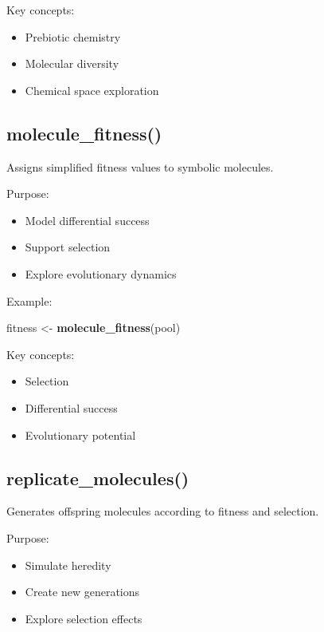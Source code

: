 \documentclass[
  oneside,
  openany]{book}
\newenvironment{Shaded}{\begin{snugshade}}{\end{snugshade}}
\newcommand{\FunctionTok}[1]{\textcolor[rgb]{0.13,0.29,0.53}{\textbf{#1}}}
\newcommand{\NormalTok}[1]{#1}
\newcommand{\OtherTok}[1]{\textcolor[rgb]{0.56,0.35,0.01}{#1}}
\providecommand{\tightlist}{%
  \setlength{\itemsep}{0pt}\setlength{\parskip}{0pt}}
\begin{document}
Key concepts:

\begin{itemize}
\tightlist
\item
  Prebiotic chemistry
\item
  Molecular diversity
\item
  Chemical space exploration
\end{itemize}

\subsection{molecule\_fitness()}\label{molecule_fitness}

Assigns simplified fitness values to symbolic molecules.

Purpose:

\begin{itemize}
\tightlist
\item
  Model differential success
\item
  Support selection
\item
  Explore evolutionary dynamics
\end{itemize}

Example:

\begin{Shaded}
\begin{Highlighting}[]
\NormalTok{fitness }\OtherTok{\textless{}{-}} \FunctionTok{molecule\_fitness}\NormalTok{(pool)}
\end{Highlighting}
\end{Shaded}

Key concepts:

\begin{itemize}
\tightlist
\item
  Selection
\item
  Differential success
\item
  Evolutionary potential
\end{itemize}

\subsection{replicate\_molecules()}\label{replicate_molecules}

Generates offspring molecules according to fitness and selection.

Purpose:

\begin{itemize}
\tightlist
\item
  Simulate heredity
\item
  Create new generations
\item
  Explore selection effects
\end{itemize}
\end{document}
